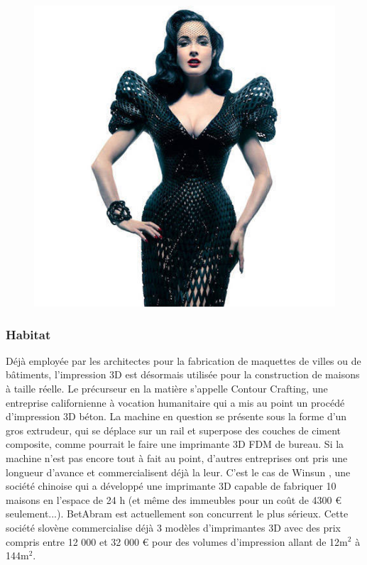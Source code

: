 \documentclass{article}
\begin{document}
\begin{figure}[h!]
\centering
\includegraphics[scale=0.4]{./images/Mode.png}
\end{figure}\hfill
\newpage

\subsubsection{Habitat}

Déjà employée par les architectes pour la fabrication de maquettes de villes ou de bâtiments, l'impression 3D est désormais utilisée pour la construction de maisons à taille réelle. Le précurseur en la matière s'appelle Contour Crafting, une entreprise californienne à vocation humanitaire qui a mis au point un procédé d'impression 3D béton. La machine en question se présente sous la forme d'un gros extrudeur, qui se déplace sur un rail et superpose des couches de ciment composite, comme pourrait le faire une imprimante 3D FDM de bureau. Si la machine n'est pas encore tout à fait au point, d'autres
entreprises ont pris une longueur d'avance et commercialisent déjà la leur. C'est le cas de Winsun , une société chinoise qui a développé une imprimante 3D capable de fabriquer 10 maisons en l'espace de 24 h (et même des immeubles pour un coût de 4300 \euro{} seulement...). BetAbram est actuellement son concurrent le plus sérieux. Cette société slovène commercialise déjà 3 modèles d'imprimantes 3D avec des prix compris entre 12 000 et 32 000 \euro{} pour des volumes d'impression allant de 12m$^{2}$ à 144m$^{2}$.
\end{document}
